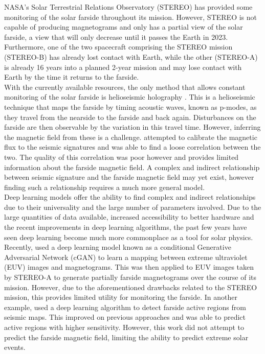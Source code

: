 \documentclass[11pt,a4paper,onecolumn]{report}
\begin{document}
NASA's Solar Terrestrial Relations Observatory (STEREO) has provided some
monitoring of the solar farside throughout its mission. However, STEREO is not
capable of producing magnetograms and only has a partial view of the solar
farside, a view that will only decrease until it passes the Earth in 2023.
Furthermore, one of the two spacecraft comprising the STEREO mission (STEREO-B)
has already lost contact with Earth, while the other (STEREO-A) is already 16
years into a planned 2-year mission and may lose contact with Earth by the time
it returns to the farside. \\



With the currently available resources, the only method that allows constant
monitoring of the solar farside is helioseismic holography
\citep{lindsey_seismic_2000}. This is a helioseismic technique that maps the
farside by timing acoustic waves, known as p-modes, as they travel from the
nearside to the farside and back again. Disturbances on the farside are then
observable by the variation in this travel time. However, inferring the magnetic
field from these is a challenge. \citet{Gonzalez_Hernandez_2007} attempted to
calibrate the magnetic flux to the seismic signatures and was able to find a
loose correlation between the two. The quality of this correlation was poor
however and provides limited information about the farside magnetic field. A
complex and indirect relationship between seismic signature and the farside
magnetic field may yet exist, however finding such a relationship requires a
much more general model.\\


Deep learning models offer the ability to find complex and indirect
relationships due to their universality and the large number of parameters
involved. Due to the large quantities of data available, increased accessibility
to better hardware and the recent improvements in deep learning algorithms, the
past few years have seen deep learning become much more commonplace as a tool
for solar physics. Recently, \citet{Kim2019} used a deep learning model known
as a conditional Generative Adversarial Network (cGAN) to learn a mapping
between extreme ultraviolet (EUV) images and magnetograms. This was then applied
to EUV images taken by STEREO-A to generate partially farside magnetograms over
the course of its mission. However, due to the aforementioned drawbacks related
to the STEREO mission, this provides limited utility for monitoring the farside.
In another example, \citet{felipe_improved_2019} used a deep learning algorithm
to detect farside active regions from seismic maps. This improved on previous
approaches and was able to predict active regions with higher sensitivity.
However, this work did not attempt to predict the farside magnetic field,
limiting the ability to predict extreme solar events. \\
\end{document}
